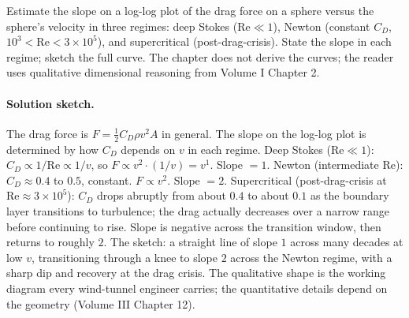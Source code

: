 \begin{exercise}
Estimate the slope on a log-log plot of the drag force on a sphere
versus the sphere's velocity in three regimes: deep Stokes
($\mathrm{Re} \ll 1$), Newton (constant $C_{D}$, $10^{3} <
\mathrm{Re} < 3 \times 10^{5}$), and supercritical
(post-drag-crisis). State the slope in each regime; sketch the full
curve. The chapter does not derive the curves; the reader uses
qualitative dimensional reasoning from Volume I Chapter 2.

\paragraph{Solution sketch.}
The drag force is $F = \tfrac{1}{2} C_{D} \rho v^{2} A$ in general.
The slope on the log-log plot is determined by how $C_{D}$ depends
on $v$ in each regime.
Deep Stokes ($\mathrm{Re} \ll 1$): $C_{D} \propto 1/\mathrm{Re}
\propto 1/v$, so $F \propto v^{2} \cdot (1/v) = v^{1}$. Slope $= 1$.
Newton (intermediate $\mathrm{Re}$): $C_{D} \approx 0.4$ to $0.5$,
constant. $F \propto v^{2}$. Slope $= 2$.
Supercritical (post-drag-crisis at $\mathrm{Re} \approx 3 \times
10^{5}$): $C_{D}$ drops abruptly from about $0.4$ to about $0.1$
as the boundary layer transitions to turbulence; the drag actually
decreases over a narrow range before continuing to rise. Slope is
negative across the transition window, then returns to roughly $2$.
The sketch: a straight line of slope $1$ across many decades at low
$v$, transitioning through a knee to slope $2$ across the Newton
regime, with a sharp dip and recovery at the drag crisis. The
qualitative shape is the working diagram every wind-tunnel engineer
carries; the quantitative details depend on the geometry (Volume
III Chapter 12).
\end{exercise}

